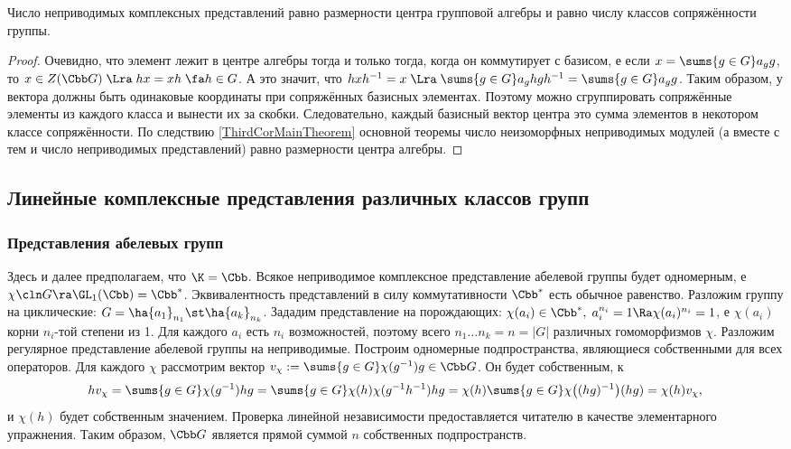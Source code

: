 \documentclass[a4paper]{article}
\newcommand{\sumg}{\sums{g\in G}}
\begin{document}
\begin{stm}
Число неприводимых комплексных представлений равно размерности центра групповой алгебры и равно числу
классов сопряжённости группы.
\end{stm}
\begin{proof}
Очевидно, что элемент лежит в центре алгебры тогда и только тогда, когда он коммутирует с базисом, е если
$x=\sumg a_g g$, то $x \in Z(\Cbb G) \; \Lra \; hx=xh \; \fa h \in G$. А это значит, что $hxh^{-1}=x \; \Lra
\; \sumg a_g h g h^{-1} = \sumg a_g g$. Таким образом, у вектора должны быть одинаковые координаты при
сопряжённых базисных элементах. Поэтому можно сгруппировать сопряжённые элементы из каждого класса и вынести
их за скобки. Следовательно, каждый базисный вектор центра это сумма элементов в некотором классе
сопряжённости. По следствию \ref{ThirdCorMainTheorem} основной теоремы число
неизоморфных неприводимых модулей (а вместе с тем и
число неприводимых представлений) равно размерности центра алгебры.
\end{proof}

\subsection{Линейные комплексные представления различных классов групп}

\subsubsection{Представления абелевых групп}

Здесь и далее предполагаем, что $\K=\Cbb$. Всякое неприводимое комплексное представление абелевой группы
будет одномерным, е $\chi\cln G \ra \GL_1(\Cbb)=\Cbb^*$. Эквивалентность представлений в силу
коммутативности $\Cbb^*$ есть обычное равенство. Разложим группу на циклические: $G = \ha{a_1}_{n_1} \st
\ha{a_k}_{n_k}$. Зададим представление на порождающих: $\chi(a_i) \in \Cbb^*, \; a_i^{n_i}=1 \Ra
\chi(a_i)^{n_i} = 1$, е $\chi(a_i)$ корни $n_i$-той степени из 1. Для каждого $a_i$ есть $n_i$
возможностей, поэтому всего $n_1 \ldots n_k=n=|G|$ различных гомоморфизмов $\chi$. Разложим регулярное
представление абелевой группы на неприводимые. Построим одномерные подпространства, являющиеся собственными
для всех операторов. Для каждого $\chi$ рассмотрим вектор $v_\chi:=\sumg \chi(g^{-1})g \in \Cbb G$. Он будет
собственным, к
$$hv_\chi = \sumg \chi(g^{-1})hg=\sumg \chi(h)\chi(g^{-1}h^{-1})hg=\chi(h)\sumg  \chi\bigl((hg)^{-1}\bigr)(hg)=\chi(h) v_\chi,$$
и $\chi(h)$ будет собственным значением. Проверка линейной независимости предоставляется читателю в
качестве элементарного упражнения. Таким образом, $\Cbb G$ является прямой суммой $n$ собственных
подпространств.
\end{document}
